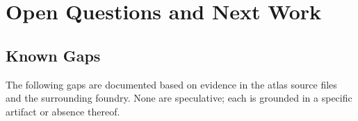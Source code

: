 
\section{Open Questions and Next Work}
\label{sec:atlas-open}

\subsection{Known Gaps}
\label{sec:atlas-open-gaps}

The following gaps are documented based on evidence in the atlas source files
and the surrounding foundry. None are speculative; each is grounded in a
specific artifact or absence thereof.

